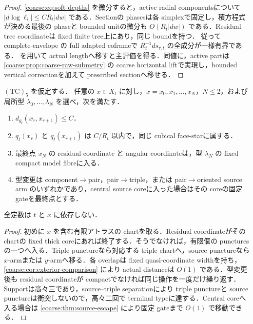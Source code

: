 \documentclass[a4paper,11pt]{ltjsarticle}
\numberwithin{equation}{section}
\theoremstyle{plain}
\theoremstyle{definition}
\theoremstyle{remark}
\begin{document}
\begin{proof}
\eqref{coarse:eq:soft-depths} を微分すると，active radial componentsについて
$|d\log\ell_i|\le CR_t|dw|$ である．Sectionの phasesは各 simplexで固定し，積方程式が決める最後の phaseと
bounded unitの微分も $O(R_t|dw|)$ である．Residual tree coordinateは fixed finite tree上にあり，同じ boundを持つ．
従って complete-envelope の full adapted coframeで $R_t^{-1}ds_{\tau,t}$ の全成分が一様有界である．
 を用いて actual lengthへ移すと主評価を得る．同値に，active partは
\cref{coarse:prop:coarse-raw-submetry} の coarse horizontal liftで実現し，bounded vertical correctionを加えて prescribed sectionへ移せる．
\end{proof}

\begin{lemma}\label{coarse:lem:residual-finite-reduction}
$\mathrm{(TC)}_5$ を仮定する．
任意の $x\in X_t$ に対し，$x=x_0,x_1,\ldots,x_N$，$N\le2$，および局所型
$\lambda_0,\ldots,\lambda_N$ を選べ，次を満たす．
\begin{enumerate}[label=\textup{(R\arabic*)}]
\item $d_{g_t}(x_{r},x_{r+1})\le C$．
\item $q_t(x_r)$ と $q_t(x_{r+1})$ は $C/R_t$ 以内で，同じ cubical face-starに属する．
\item 最終点 $x_N$ の residual coordinate と angular coordinateは，型 $\lambda_N$ の fixed compact model fibreに入る．
\item 型変更は component$\to$pair，pair$\to$triple，または pair$\to$oriented source arm のいずれかであり，central source coreに入った場合はその coreの固定 gateを最終点とする．
\end{enumerate}
全定数は $t$ と $x$ に依存しない．
\end{lemma}

\begin{proof}
初めに $x$ を含む有限アトラスの chartを取る．Residual coordinateがその chartの fixed thick coreにあれば終了する．そうでなければ，有限個の puncturesの一つへ入る．Triple punctureなら対応する triple chartへ，source punctureなら $x$-armまたは $y$-armへ移る．各 overlapは fixed quasi-coordinate widthを持ち，\cref{coarse:cor:exterior-comparison} により actual distanceは $O(1)$ である．型変更後も residual coordinateが compactでなければ同じ操作を一度だけ繰り返す．Supportは高々三であり，source--triple separationにより triple punctureと source punctureは衝突しないので，高々二回で terminal typeに達する．Central coreへ入る場合は \cref{coarse:thm:source-escape} により固定 gateまで $O(1)$ で移動できる．
\end{proof}
\end{document}
